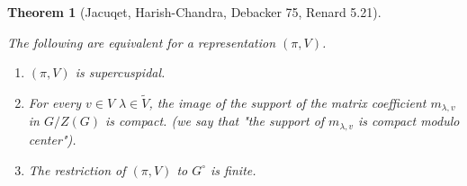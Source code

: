 \documentclass[8pt]{article}
\newtheorem{theorem}{Theorem} [section]
\begin{document}
\begin{theorem}[Jacuqet, Harish-Chandra, Debacker 75, Renard 5.21]
  \label{theorem_51}
  \par The following are equivalent for a representation $(\pi,V)$.
  \begin{enumerate}[1).]
    \item $(\pi,V)$ is supercuspidal.
    \item For every $v\in V$ $\lambda\in\widetilde{V}$, the image of the support of the matrix coefficient $m_{\lambda,v}$ in $G/Z(G)$ is compact. (we say that "the support of $m_{\lambda,v}$ is compact modulo center").
    \item The restriction of $(\pi,V)$ to $G^\circ$ is finite.
  \end{enumerate}
\end{theorem}
\end{document}

